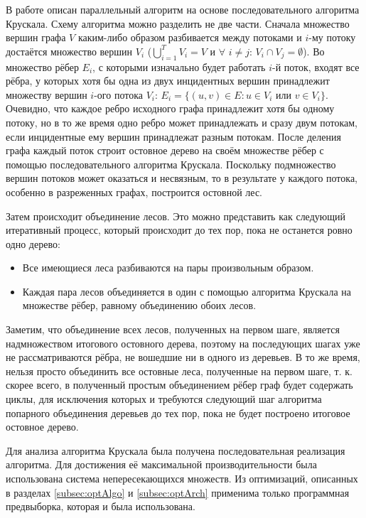 \documentclass[a4paper,12pt]{extarticle}
\begin{document}
В работе \cite{kruskal-parallel} описан параллельный алгоритм на основе последовательного алгоритма Крускала.
Схему алгоритма можно разделить не две части.
Сначала множество вершин графа $V$ каким-либо образом разбивается между потоками и $i$-му потоку достаётся множество вершин $V_i$ ($ \displaystyle \bigcup_{i=1}^T V_i = V $ и $\forall$ $i \neq j$: $V_i \cap V_j = \emptyset$). 
Во множество рёбер $E_i$, с которыми изначально будет работать $i$-й поток, входят все рёбра, у которых хотя бы одна из двух инцидентных вершин принадлежит множеству вершин $i$-ого потока $V_i$: 
$E_i = \{ (u, v) \in E : u \in V_i$ или $v \in V_i \}$.
Очевидно, что каждое ребро исходного графа принадлежит хотя бы одному потоку, но в то же время одно ребро может принадлежать и сразу двум потокам, если инцидентные ему вершин принадлежат разным потокам.
После деления графа каждый поток строит остовное дерево на своём множестве рёбер с помощью последовательного алгоритма Крускала. 
Поскольку подмножество вершин потоков может оказаться и несвязным, то в результате у каждого потока, особенно в разреженных графах, построится остовной лес.

Затем происходит объединение лесов. Это можно представить как следующий итеративный процесс, который происходит до тех пор, пока не останется ровно одно дерево:
\begin{itemize}
    \item Все имеющиеся леса разбиваются на пары произвольным образом.
    \item Каждая пара лесов объединяется в один с помощью алгоритма Крускала на множестве рёбер, равному объединению обоих лесов.
\end{itemize}

Заметим, что объединение всех лесов, полученных на первом шаге, является надмножеством итогового остовного дерева, поэтому на последующих шагах уже не рассматриваются рёбра, не вошедшие ни в одного из деревьев.
В то же время, нельзя просто объединить все остовные леса, полученные на первом шаге, т. к. скорее всего, в полученный простым объединением рёбер граф будет содержать циклы, для исключения которых и требуются следующий шаг алгоритма попарного объединения деревьев до тех пор, пока не будет построено итоговое остовное дерево.

Для анализа алгоритма Крускала была получена последовательная реализация алгоритма.
Для достижения её максимальной производительности была использована система непересекающихся множеств.
Из оптимизаций, описанных в разделах \ref{subsec:optAlgo} и \ref{subsec:optArch} применима только программная предвыборка, которая и была использована.
\end{document}
